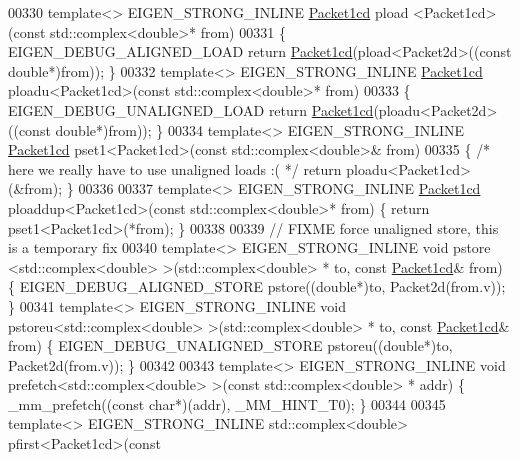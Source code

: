 \begin{DoxyCode}
00330 \textcolor{keyword}{template}<> EIGEN\_STRONG\_INLINE \hyperlink{struct_eigen_1_1internal_1_1_packet1cd}{Packet1cd} pload <Packet1cd>(\textcolor{keyword}{const} std::complex<double>* from)
00331 \{ EIGEN\_DEBUG\_ALIGNED\_LOAD \textcolor{keywordflow}{return} \hyperlink{struct_eigen_1_1internal_1_1_packet1cd}{Packet1cd}(pload<Packet2d>((\textcolor{keyword}{const} \textcolor{keywordtype}{double}*)from)); \}
00332 \textcolor{keyword}{template}<> EIGEN\_STRONG\_INLINE \hyperlink{struct_eigen_1_1internal_1_1_packet1cd}{Packet1cd} ploadu<Packet1cd>(\textcolor{keyword}{const} std::complex<double>* from)
00333 \{ EIGEN\_DEBUG\_UNALIGNED\_LOAD \textcolor{keywordflow}{return} \hyperlink{struct_eigen_1_1internal_1_1_packet1cd}{Packet1cd}(ploadu<Packet2d>((\textcolor{keyword}{const} \textcolor{keywordtype}{double}*)from)); \}
00334 \textcolor{keyword}{template}<> EIGEN\_STRONG\_INLINE \hyperlink{struct_eigen_1_1internal_1_1_packet1cd}{Packet1cd} pset1<Packet1cd>(\textcolor{keyword}{const} std::complex<double>&  from)
00335 \{ \textcolor{comment}{/* here we really have to use unaligned loads :( */} \textcolor{keywordflow}{return} ploadu<Packet1cd>(&from); \}
00336 
00337 \textcolor{keyword}{template}<> EIGEN\_STRONG\_INLINE \hyperlink{struct_eigen_1_1internal_1_1_packet1cd}{Packet1cd} ploaddup<Packet1cd>(\textcolor{keyword}{const} std::complex<double>* from) \{ \textcolor{keywordflow}{
      return} pset1<Packet1cd>(*from); \}
00338 
00339 \textcolor{comment}{// FIXME force unaligned store, this is a temporary fix}
00340 \textcolor{keyword}{template}<> EIGEN\_STRONG\_INLINE \textcolor{keywordtype}{void} pstore <std::complex<double> >(std::complex<double> *   to, \textcolor{keyword}{const} 
      \hyperlink{struct_eigen_1_1internal_1_1_packet1cd}{Packet1cd}& from) \{ EIGEN\_DEBUG\_ALIGNED\_STORE pstore((\textcolor{keywordtype}{double}*)to, Packet2d(from.v)); \}
00341 \textcolor{keyword}{template}<> EIGEN\_STRONG\_INLINE \textcolor{keywordtype}{void} pstoreu<std::complex<double> >(std::complex<double> *   to, \textcolor{keyword}{const} 
      \hyperlink{struct_eigen_1_1internal_1_1_packet1cd}{Packet1cd}& from) \{ EIGEN\_DEBUG\_UNALIGNED\_STORE pstoreu((\textcolor{keywordtype}{double}*)to, Packet2d(from.v)); \}
00342 
00343 \textcolor{keyword}{template}<> EIGEN\_STRONG\_INLINE \textcolor{keywordtype}{void} prefetch<std::complex<double> >(\textcolor{keyword}{const} std::complex<double> *   addr) \{ 
      \_mm\_prefetch((\textcolor{keyword}{const} \textcolor{keywordtype}{char}*)(addr), \_MM\_HINT\_T0); \}
00344 
00345 \textcolor{keyword}{template}<> EIGEN\_STRONG\_INLINE std::complex<double>  pfirst<Packet1cd>(\textcolor{keyword}{const} 

\end{DoxyCode}
